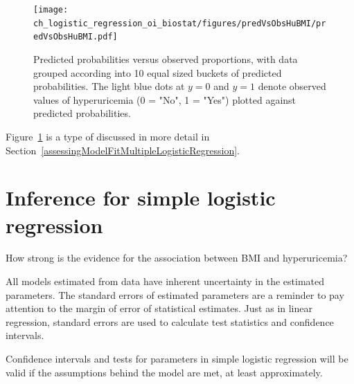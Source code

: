 \begin{figure}[!tbh]
  \centering
  \texttt{[image: ch\_logistic\_regression\_oi\_biostat/figures/predVsObsHuBMI/predVsObsHuBMI.pdf]}
    \caption{Predicted probabilities versus observed proportions, with data grouped according into 10 equal sized buckets of predicted probabilities. The light blue dots at  $y = 0$ and $y = 1$ denote observed values of hyperuricemia (0 = "No", 1 = "Yes") plotted against predicted probabilities.}
    \label{figure:predVsObsHuBMI}
\end{figure}

Figure~\ref{figure:predVsObsHuBMI} is a type of  discussed in more detail in Section~\ref{assessingModelFitMultipleLogisticRegression}.




\section{Inference for simple logistic regression} \label{inferenceSimpleLogisticRegression}

How strong is the evidence for the association between BMI and hyperuricemia?

All models estimated from data have inherent uncertainty in the estimated parameters.  The standard errors of estimated parameters are a reminder to pay attention to the margin of error of statistical estimates.  Just as in linear regression, standard errors are used to calculate test statistics and confidence intervals.

Confidence intervals and tests for parameters in simple logistic regression will be valid if the assumptions behind the model are met, at least approximately.



